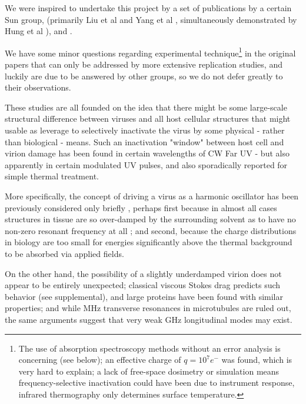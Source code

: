 \documentclass[paper.tex]{subfiles}
\begin{document}


We were inspired to undertake this project by a set of publications by a certain Sun group, (primarily Liu et al \cite{Microwave2009} and Yang et al \cite{Efficient2015}, simultaneously demonstrated by Hung et al \cite{focusing2014}), and \cite{Optical2020} \cite{Theoretical2020}.

We have some minor questions regarding experimental technique\footnote{The use of absorption spectroscopy methods without an error analysis is concerning (see below); an effective charge of $q=10^7 e^-$ was found, which is very hard to explain; a lack of free-space dosimetry or simulation means frequency-selective inactivation could have been due to instrument response, infrared thermography only determines surface temperature.} in the original papers that can only be addressed by more extensive replication studies, and luckily are due to be answered by other groups\cite{Generating}, so we do not defer greatly to their observations. 

These studies are all founded on the idea that there might be some large-scale structural difference between viruses and all host cellular structures that might usable as leverage to selectively inactivate the virus by some physical - rather than biological - means. Such an inactivation "window" between host cell and virion damage has been found in certain wavelengths of CW Far UV\cite{Germicidal2017} - but also apparently in certain modulated UV pulses\cite{Use1987a}\cite{Can1993}, and also sporadically reported for simple thermal treatment\cite{Summary}. 

More specifically, the concept of driving a virus as a harmonic oscillator has been previously considered only briefly \cite{MECHANICAL1968}\cite{Comment2004}, perhaps first because in almost all cases structures in tissue are so over-damped by the surrounding solvent\cite{Vibrational2002}\cite{Biological2002}\cite{Biophysics2000}\cite{Viscous2000} as to have no non-zero resonant frequency at all \cite{dielectric1996}\cite{gabriel1996compilation}; and second, because the charge distributions in biology are too small for energies significantly above the thermal background to be absorbed via applied fields. 

On the other hand, the possibility of a slightly underdamped virion does not appear to be entirely unexpected; classical viscous Stokes drag predicts such behavior\cite{nature1986} (see supplemental), and large proteins have been found with similar properties\cite{Microwave1994}; and while MHz transverse resonances in microtubules are ruled out\cite{Viscous2000}, the same arguments suggest that very weak GHz longitudinal modes may exist. 
\end{document}
